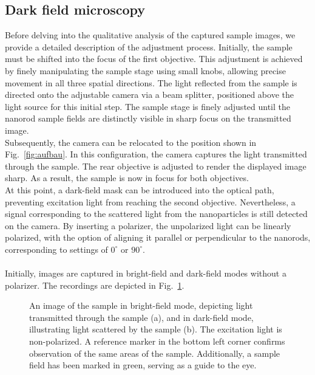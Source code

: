 \subsection{\label{sec:A1}Dark field microscopy}
Before delving into the qualitative analysis of the captured sample images, 
we provide a detailed description of the adjustment process. 
Initially, the sample must be shifted into the focus of the first objective. 
This adjustment is achieved by finely manipulating the sample stage using small knobs, 
allowing precise movement in all three spatial directions. 
The light reflected from the sample is directed onto the adjustable camera via a beam splitter, 
positioned above the light source for this initial step. 
The sample stage is finely adjusted until the nanorod sample fields are distinctly visible 
in sharp focus on the transmitted image. \\
Subsequently, the camera can be relocated to the position shown 
in Fig.~\ref{fig:aufbau}. 
In this configuration, the camera captures the light transmitted through the sample. 
The rear objective is adjusted to render the displayed image sharp. 
As a result, the sample is now in focus for both objectives. \\
At this point, a dark-field mask can be introduced into the optical path, 
preventing excitation light from reaching the second objective. 
Nevertheless, a signal corresponding to the scattered light from the nanoparticles is still 
detected on the camera. 
By inserting a polarizer, the unpolarized light can be linearly polarized, 
with the option of aligning it parallel or perpendicular to the nanorods, 
corresponding to settings of $0^{\circ}$ or $90^{\circ}$. \\ \\
Initially, images are captured in bright-field and dark-field modes without a polarizer. 
The recordings are depicted in Fig.~\ref{fig:bilder}.
\begin{figure}[h!]
    \centering
    \qquad
    \caption{\label{fig:bilder}An image of the sample in bright-field mode, depicting light transmitted 
    through the sample (a), and in dark-field mode, illustrating light scattered by the sample (b). 
    The excitation light is non-polarized. A reference marker in the bottom left corner confirms 
    observation of the same areas of the sample.
    Additionally, a sample field has been marked in green, serving as a guide to the eye.}
\end{figure}\FloatBarrier 
